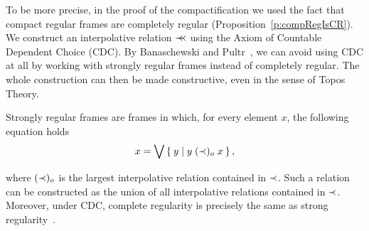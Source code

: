 To be more precise, in the proof of the compactification we used the fact that compact regular frames are completely regular (Proposition~\ref{p:compRegIsCR}).
We construct an interpolative relation $\prec\mkern-8mu\prec$ using the Axiom of Countable Dependent Choice (CDC). By Banaschewski and Pultr~\cite{banaschewski2002constructive}, we can avoid using CDC at all by working with strongly regular frames instead of completely regular. The whole construction can then be made constructive, even in the sense of Topos Theory.

Strongly regular frames are frames in which, for every element $x$, the following equation holds
$$ x = \bigvee \Set{ y | y\;(\prec)_o\;x }, $$

\noindent where $(\prec)_o$ is the largest interpolative relation contained in $\prec$. Such a relation can be constructed as the union of all interpolative relations contained in $\prec$. Moreover, under CDC, complete regularity is precisely the same as strong regularity~\cite{banaschewski2002constructive}.
